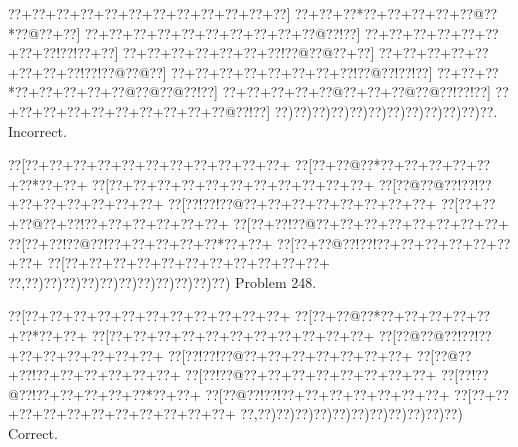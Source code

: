 \documentclass[a5paper]{article}
\begin{document}
\begin{center}
{\goo
\0??+\0??+\0??+\0??+\0??+\0??+\0??+\0??+\0??+\0??+\0??+\0??]
\0??+\0??+\0??*\0??+\0??+\0??+\0??+\0??@\0??*\0??@\0??+\0??]
\0??+\0??+\0??+\0??+\0??+\0??+\0??+\0??+\0??+\0??@\0??!\0??]
\0??+\0??+\0??+\0??+\0??+\0??+\0??+\0??!\0??!\0??+\0??]
\0??+\0??+\0??+\0??+\0??+\0??+\0??!\0??@\0??@\0??+\0??]
\0??+\0??+\0??+\0??+\0??+\0??+\0??+\0??!\0??!\0??@\0??@\0??]
\0??+\0??+\0??+\0??+\0??+\0??+\0??+\0??!\0??@\0??!\0??!\0??]
\0??+\0??+\0??*\0??+\0??+\0??+\0??+\0??@\0??@\0??@\0??!\0??]
\0??+\0??+\0??+\0??+\0??@\0??+\0??+\0??@\0??@\0??!\0??!\0??]
\0??+\0??+\0??+\0??+\0??+\0??+\0??+\0??+\0??+\0??@\0??!\0??]
\0??)\0??)\0??)\0??)\0??)\0??)\0??)\0??)\0??)\0??)\0??)\0??.
}
Incorrect. 

\end{center}
\newpage
\begin{center}
{\goo
\0??[\0??+\0??+\0??+\0??+\0??+\0??+\0??+\0??+\0??+\0??+\0??+
\0??[\0??+\0??@\0??*\0??+\0??+\0??+\0??+\0??+\0??*\0??+\0??+
\0??[\0??+\0??+\0??+\0??+\0??+\0??+\0??+\0??+\0??+\0??+\0??+
\0??[\0??@\0??@\0??!\0??!\0??+\0??+\0??+\0??+\0??+\0??+\0??+
\0??[\0??!\0??!\0??@\0??+\0??+\0??+\0??+\0??+\0??+\0??+\0??+
\0??[\0??+\0??+\0??@\0??+\0??!\0??+\0??+\0??+\0??+\0??+\0??+
\0??[\0??+\0??!\0??@\0??+\0??+\0??+\0??+\0??+\0??+\0??+\0??+
\0??[\0??+\0??!\0??@\0??!\0??+\0??+\0??+\0??+\0??*\0??+\0??+
\0??[\0??+\0??@\0??!\0??!\0??+\0??+\0??+\0??+\0??+\0??+\0??+
\0??[\0??+\0??+\0??+\0??+\0??+\0??+\0??+\0??+\0??+\0??+\0??+
\0??,\0??)\0??)\0??)\0??)\0??)\0??)\0??)\0??)\0??)\0??)\0??)
}
Problem 248.

\end{center}
\begin{center}
{\goo
\0??[\0??+\0??+\0??+\0??+\0??+\0??+\0??+\0??+\0??+\0??+\0??+
\0??[\0??+\0??@\0??*\0??+\0??+\0??+\0??+\0??+\0??*\0??+\0??+
\0??[\0??+\0??+\0??+\0??+\0??+\0??+\0??+\0??+\0??+\0??+\0??+
\0??[\0??@\0??@\0??!\0??!\0??+\0??+\0??+\0??+\0??+\0??+\0??+
\0??[\0??!\0??!\0??@\0??+\0??+\0??+\0??+\0??+\0??+\0??+
\0??[\0??@\0??+\0??!\0??+\0??+\0??+\0??+\0??+\0??+
\0??[\0??!\0??@\0??+\0??+\0??+\0??+\0??+\0??+\0??+\0??+
\0??[\0??!\0??@\0??!\0??+\0??+\0??+\0??+\0??*\0??+\0??+
\0??[\0??@\0??!\0??!\0??+\0??+\0??+\0??+\0??+\0??+\0??+
\0??[\0??+\0??+\0??+\0??+\0??+\0??+\0??+\0??+\0??+\0??+\0??+
\0??,\0??)\0??)\0??)\0??)\0??)\0??)\0??)\0??)\0??)\0??)\0??)
}
Correct. 

\end{center}
\end{document}
